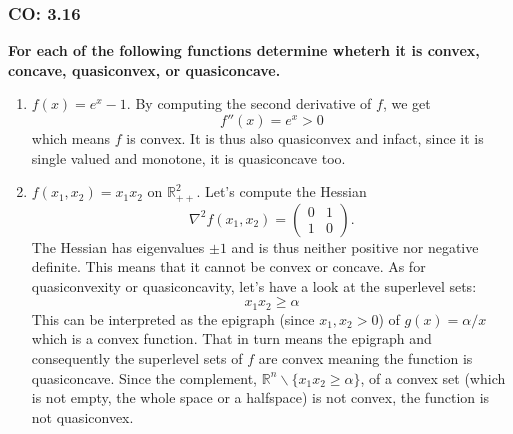 \subsubsection{CO: 3.16}
\textbf{For each of the following functions determine wheterh it is convex, concave, quasiconvex, or quasiconcave.}
\begin{enumerate}[label=(\alph*)]
    \item $f(x) = e^x - 1$. By computing the second derivative of $f$, we get
    \[
        f''(x) = e^x > 0
    \]
    which means $f$ is convex.
    It is thus also quasiconvex and infact, since it is single valued and monotone, it is quasiconcave too.
    \item $f(x_1, x_2) = x_1 x_2$ on $\mathbb{R}_{++}^2$.
    Let's compute the Hessian
    \[
        \nabla^2 f(x_1, x_2) = \begin{pmatrix}
            0 & 1\\
            1 & 0
        \end{pmatrix}.
    \]
    The Hessian has eigenvalues $\pm 1$ and is thus neither positive nor negative definite. 
    This means that it cannot be convex or concave. 
    As for quasiconvexity or quasiconcavity, let's have a look at the superlevel sets:
    \[
        x_1x_2 \geq \alpha
    \]
    This can be interpreted as the epigraph (since $x_1, x_2 > 0$) of $g(x) = \alpha / x$ which is a convex function.
    That in turn means the epigraph and consequently the superlevel sets of $f$ are convex meaning the function is quasiconcave.
    Since the complement, $\mathbb{R}^n \backslash \{x_1x_2 \geq \alpha\}$, of a convex set (which is not empty, the whole space or a halfspace) is not convex, the function is not quasiconvex.
    

\end{enumerate}
